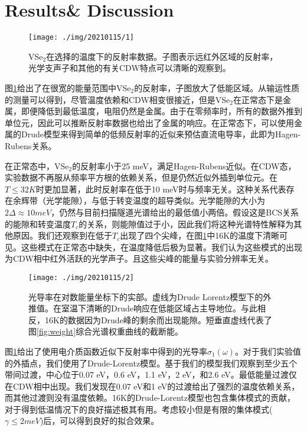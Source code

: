 \documentclass[reprint, aps, prb, showkeys]{revtex4-2}
\begin{document}
\section{Results\& Discussion}
\begin{figure}[t]
    \texttt{[image: ./img/20210115/1]}
    \caption{\label{fig:reflectivity} 
    VSe$_2$在选择的温度下的反射率数据。子图表示远红外区域的反射率，光学支声子和其他的有关CDW特点可以清晰的观察到。
    }
\end{figure}
图\ref{fig:reflectivity}给出了在很宽的能量范围中VSe$_2$的反射率，子图放大了低能区域。从输运性质的测量可以得到，尽管温度依赖和CDW相变很接近，但是VSe$_2$在正常态下是金属，即便降低到最低温度，电阻仍然是金属。由于在零频率时，所有的数据外推到单位元，因此可以推断反射率数据也给出了金属的响应。在正常态下，可以使用金属的Drude模型来得到简单的低频反射率的近似来预估直流电导率，此即为Hagen-Rubens关系。

在正常态中，VSe$_2$的反射率小于25 meV，满足Hagen-Rubens近似。在CDW态，实验数据不再服从频率平方根的依赖关系，但是仍然近似外插到单位元。在$T \leq 32K$时更加显著，此时反射率在低于10 meV时与频率无关。这种关系代表存在余辉带（光学能隙），与低于转变温度的超导类似。光学能隙的大小为$2\Delta \approx 10 meV$，仍然与目前扫描隧道光谱给出的最低值小两倍。假设这是BCS关系的能隙和转变温度$T_c$的关系，则能隙值过于小，因此我们将这种光谱特性解释为其他原因。我们还观察到在低于$T_c$出现了四个尖峰，在图\ref{fig:reflectivity}中16K的温度下清晰可见。这些模式在正常态中缺失，在温度降低后极为显著。我们认为这些模式的出现为CDW相中红外活跃的光学声子。且这些尖峰的能量与实验分辨率无关。

\begin{figure}[t]
    \texttt{[image: ./img/20210115/2]}
    \caption{\label{fig:conductivity} 
    光导率在对数能量坐标下的实部。虚线为Drude Lorentz模型下的外推值。在室温下清晰的Drude响应在低能区域占主导地位。与此相反，16K的数据因为Drude峰的剩余而出现能隙。短垂直虚线代表了图\ref{fig:weight}综合光谱权重曲线的截断能。
    }
\end{figure}

图\ref{fig:reflectivity}给出了使用电介质函数近似下反射率中得到的光导率$\sigma_1(\omega)$。对于我们实验值的外插点，我们使用了Drude-Lorentz模型。基于我们的模型我们观察到至少五个带间过渡，中心位于0.07 eV，0.6 eV，1.1 eV，2 eV，和2.6 eV。最低能量过渡仅在CDW相中出现。我们发现在0.07 eV和1 eV的过渡给出了强烈的温度依赖关系，而其他过渡则没有温度依赖。16K的Drude-Lorentz模型也包含集体模式的贡献，对于得到低温情况下的良好描述极其有用。考虑较小但是有限的集体模式($\gamma \leq 2 meV$)后，可以得到良好的拟合效果。
\end{document}
